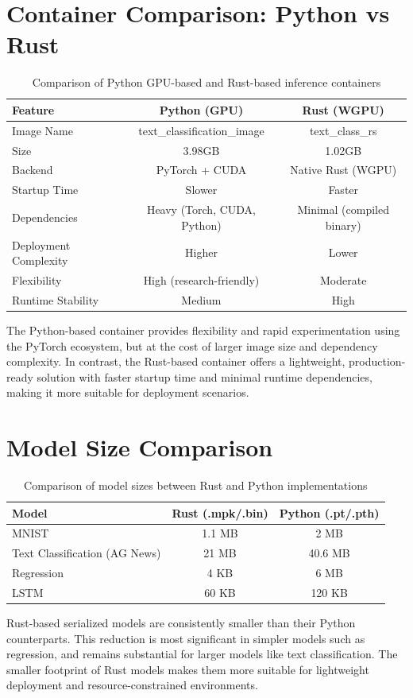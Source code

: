 \documentclass[11pt,a4paper]{article}
\begin{document}
\section{Container Comparison: Python vs Rust}

\begin{table}[h]
\centering
\begin{tabular}{|l|c|c|}
\hline
\textbf{Feature} & \textbf{Python (GPU)} & \textbf{Rust (WGPU)} \\
\hline
Image Name & text\_classification\_image & text\_class\_rs \\
\hline
Size &  3.98GB &  1.02GB \\
\hline
Backend & PyTorch + CUDA & Native Rust (WGPU) \\
\hline
Startup Time & Slower & Faster \\
\hline
Dependencies & Heavy (Torch, CUDA, Python) & Minimal (compiled binary) \\
\hline
Deployment Complexity & Higher & Lower \\
\hline
Flexibility & High (research-friendly) & Moderate \\
\hline
Runtime Stability & Medium & High \\
\hline
\end{tabular}
\caption{Comparison of Python GPU-based and Rust-based inference containers}
\end{table}

\noindent
The Python-based container provides flexibility and rapid experimentation using the PyTorch ecosystem, but at the cost of larger image size and dependency complexity. In contrast, the Rust-based container offers a lightweight, production-ready solution with faster startup time and minimal runtime dependencies, making it more suitable for deployment scenarios.

\section{Model Size Comparison}

\begin{table}[h]
\centering
\begin{tabular}{|l|c|c|}
\hline
\textbf{Model} & \textbf{Rust (.mpk/.bin)} & \textbf{Python (.pt/.pth)} \\
\hline
MNIST & 1.1 MB & 2 MB \\
\hline
Text Classification (AG News) & 21 MB & 40.6 MB \\
\hline
Regression & 4 KB & 6 MB \\
\hline
LSTM & 60 KB & 120 KB \\
\hline
\end{tabular}
\caption{Comparison of model sizes between Rust and Python implementations}
\end{table}

\noindent
Rust-based serialized models are consistently smaller than their Python counterparts. This reduction is most significant in simpler models such as regression, and remains substantial for larger models like text classification. The smaller footprint of Rust models makes them more suitable for lightweight deployment and resource-constrained environments.
\end{document}
